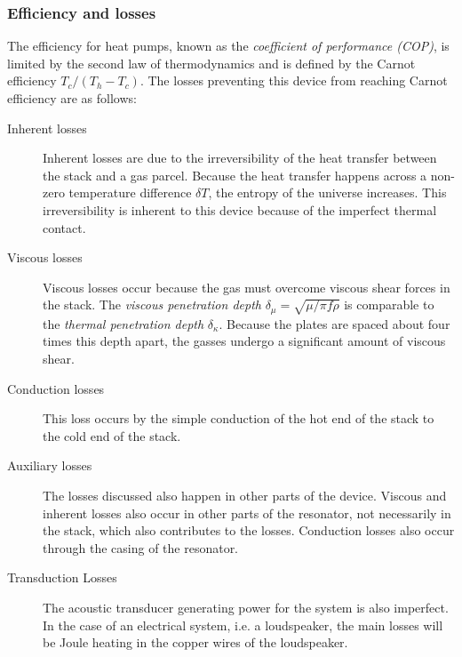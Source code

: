 \documentclass[a4paper]{article}
\begin{document}
\subsubsection{Efficiency and losses}
The efficiency for heat pumps, known as the \emph{coefficient of performance (COP)}, is limited by the second law of thermodynamics and is defined by the Carnot efficiency \(T_c/(T_h-T_c)\). The losses preventing this device from reaching Carnot efficiency are as follows:
\begin{description}
  \item[Inherent losses] Inherent losses are due to the irreversibility of the heat transfer between the stack and a gas parcel. Because the heat transfer happens across a non-zero temperature difference \(\delta T\), the entropy of the universe increases. This irreversibility is inherent to this device because of the imperfect thermal contact. %
  \item[Viscous losses] Viscous losses occur because the gas must overcome viscous shear forces in the stack. The \emph{viscous penetration depth} \(\delta_\mu=\sqrt{\mu / \pi f \rho} \) is comparable to the \emph{thermal penetration depth} \(\delta_\kappa\). Because the plates are spaced about four times this depth apart, the gasses undergo a significant amount of viscous shear.
  \item[Conduction losses] This loss occurs by the simple conduction of the hot end of the stack to the cold end of the stack.
  \item[Auxiliary losses] The losses discussed also happen in other parts of the device. Viscous and inherent losses also occur in other parts of the resonator, not necessarily in the stack, which also contributes to the losses. Conduction losses also occur through the casing of the resonator.
  \item[Transduction Losses] The acoustic transducer generating power for the system is also imperfect. In the case of an electrical system, i.e. a loudspeaker, the main losses will be Joule heating in the copper wires of the loudspeaker.
\end{description}
\end{document}
